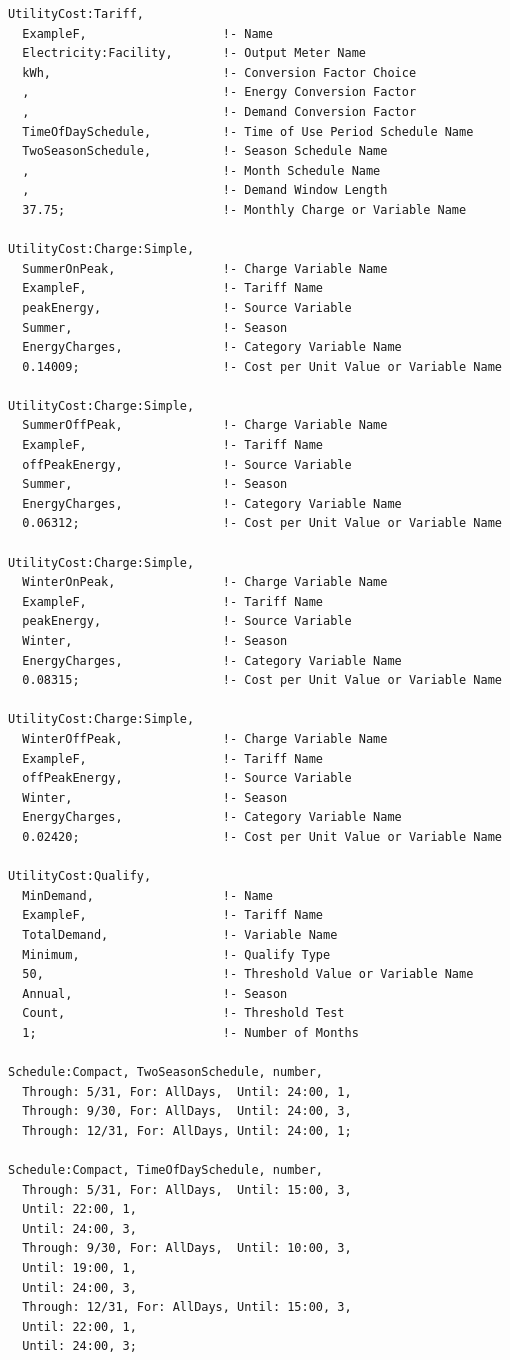 \begin{lstlisting}
UtilityCost:Tariff,
  ExampleF,                   !- Name
  Electricity:Facility,       !- Output Meter Name
  kWh,                        !- Conversion Factor Choice
  ,                           !- Energy Conversion Factor
  ,                           !- Demand Conversion Factor
  TimeOfDaySchedule,          !- Time of Use Period Schedule Name
  TwoSeasonSchedule,          !- Season Schedule Name
  ,                           !- Month Schedule Name
  ,                           !- Demand Window Length
  37.75;                      !- Monthly Charge or Variable Name

UtilityCost:Charge:Simple,
  SummerOnPeak,               !- Charge Variable Name
  ExampleF,                   !- Tariff Name
  peakEnergy,                 !- Source Variable
  Summer,                     !- Season
  EnergyCharges,              !- Category Variable Name
  0.14009;                    !- Cost per Unit Value or Variable Name

UtilityCost:Charge:Simple,
  SummerOffPeak,              !- Charge Variable Name
  ExampleF,                   !- Tariff Name
  offPeakEnergy,              !- Source Variable
  Summer,                     !- Season
  EnergyCharges,              !- Category Variable Name
  0.06312;                    !- Cost per Unit Value or Variable Name

UtilityCost:Charge:Simple,
  WinterOnPeak,               !- Charge Variable Name
  ExampleF,                   !- Tariff Name
  peakEnergy,                 !- Source Variable
  Winter,                     !- Season
  EnergyCharges,              !- Category Variable Name
  0.08315;                    !- Cost per Unit Value or Variable Name

UtilityCost:Charge:Simple,
  WinterOffPeak,              !- Charge Variable Name
  ExampleF,                   !- Tariff Name
  offPeakEnergy,              !- Source Variable
  Winter,                     !- Season
  EnergyCharges,              !- Category Variable Name
  0.02420;                    !- Cost per Unit Value or Variable Name

UtilityCost:Qualify,
  MinDemand,                  !- Name
  ExampleF,                   !- Tariff Name
  TotalDemand,                !- Variable Name
  Minimum,                    !- Qualify Type
  50,                         !- Threshold Value or Variable Name
  Annual,                     !- Season
  Count,                      !- Threshold Test
  1;                          !- Number of Months

Schedule:Compact, TwoSeasonSchedule, number,
  Through: 5/31, For: AllDays,  Until: 24:00, 1,
  Through: 9/30, For: AllDays,  Until: 24:00, 3,
  Through: 12/31, For: AllDays, Until: 24:00, 1;

Schedule:Compact, TimeOfDaySchedule, number,
  Through: 5/31, For: AllDays,  Until: 15:00, 3,
  Until: 22:00, 1,
  Until: 24:00, 3,
  Through: 9/30, For: AllDays,  Until: 10:00, 3,
  Until: 19:00, 1,
  Until: 24:00, 3,
  Through: 12/31, For: AllDays, Until: 15:00, 3,
  Until: 22:00, 1,
  Until: 24:00, 3;
\end{lstlisting}

